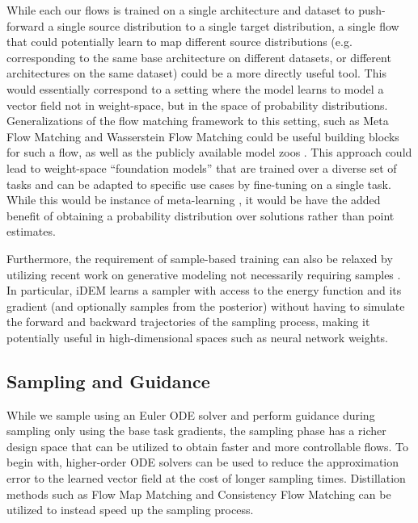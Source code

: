 While each our flows is trained on a single architecture and dataset to push-forward a single source distribution to a single target distribution, a single flow that could potentially learn to map different source distributions (e.g. corresponding to the same base architecture on different datasets, or different architectures on the same dataset) could be a more directly useful tool. This would essentially correspond to a setting where the model learns to model a vector field not in weight-space, but in the space of probability distributions. Generalizations of the flow matching framework to this setting, such as Meta Flow Matching \citep{atanackovicMetaFlowMatching2024a} and Wasserstein Flow Matching \citep{havivWassersteinFlowMatching2024} could be useful building blocks for such a flow, as well as the publicly available model zoos \citep{schurholtModelZoosDataset2022}. This approach could lead to weight-space ``foundation models'' that are trained over a diverse set of tasks and can be adapted to specific use cases by fine-tuning on a single task. While this would be instance of meta-learning \citep{hospedalesMetaLearningNeuralNetworks2022}, it would be have the added benefit of obtaining a probability distribution over solutions rather than point estimates. 

Furthermore, the requirement of sample-based training can also be relaxed by utilizing recent work on generative modeling not necessarily requiring samples \citep{vargasTransportMeetsVariational2023,akhound-sadeghIteratedDenoisingEnergy2024}. In particular, iDEM \citep{akhound-sadeghIteratedDenoisingEnergy2024} learns a sampler with access to the energy function and its gradient (and optionally samples from the posterior) without having to simulate the forward and backward trajectories of the sampling process, making it potentially useful in high-dimensional spaces such as neural network weights. 

\subsection{Sampling and Guidance}

While we sample using an Euler ODE solver and perform guidance during sampling only using the base task gradients, the sampling phase has a richer design space that can be utilized to obtain faster and more controllable flows. To begin with, higher-order ODE solvers can be used to reduce the approximation error to the learned vector field at the cost of longer sampling times. Distillation methods such as Flow Map Matching \citep{boffiFlowMapMatching2024} and Consistency Flow Matching \citep{yangConsistencyFlowMatching2024} can be utilized to instead speed up the sampling process.  

